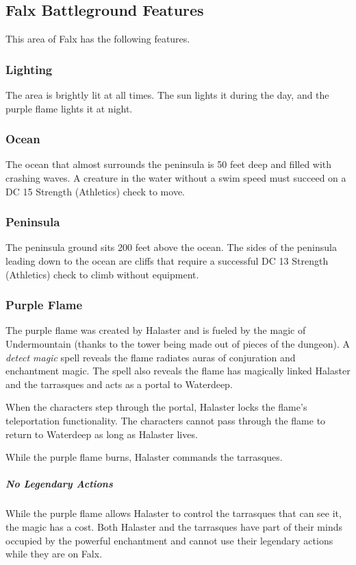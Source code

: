 \documentclass[10pt,a4paper,twoside,bg=print,twocolumn,openany,nodeprecatedcode]{dndbook}
\begin{document}
\subsection{Falx Battleground Features}
This area of Falx has the following features.

\subsubsection{Lighting}
The area is brightly lit at all times. The sun lights it during the day, and the purple flame lights it at night.

\subsubsection{Ocean}
The ocean that almost surrounds the peninsula is 50 feet deep and filled with crashing waves. A creature in the water without a swim speed must succeed on a DC 15 Strength (Athletics) check to move.

\subsubsection{Peninsula}
The peninsula ground sits 200 feet above the ocean. The sides of the peninsula leading down to the ocean are cliffs that require a successful DC 13 Strength (Athletics) check to climb without equipment.

\subsubsection{Purple Flame}
The purple flame was created by Halaster and is fueled by the magic of Undermountain (thanks to the tower being made out of pieces of the dungeon). A \textit{detect magic} spell reveals the flame radiates auras of conjuration and enchantment magic. The spell also reveals the flame has magically linked Halaster and the tarrasques and acts as a portal to Waterdeep.

When the characters step through the portal, Halaster locks the flame's teleportation functionality. The characters cannot pass through the flame to return to Waterdeep as long as Halaster lives.

While the purple flame burns, Halaster commands the tarrasques.

\subparagraph{No Legendary Actions}
While the purple flame allows Halaster to control the tarrasques that can see it, the magic has a cost. Both Halaster and the tarrasques have part of their minds occupied by the powerful enchantment and cannot use their legendary actions while they are on Falx.
\end{document}
